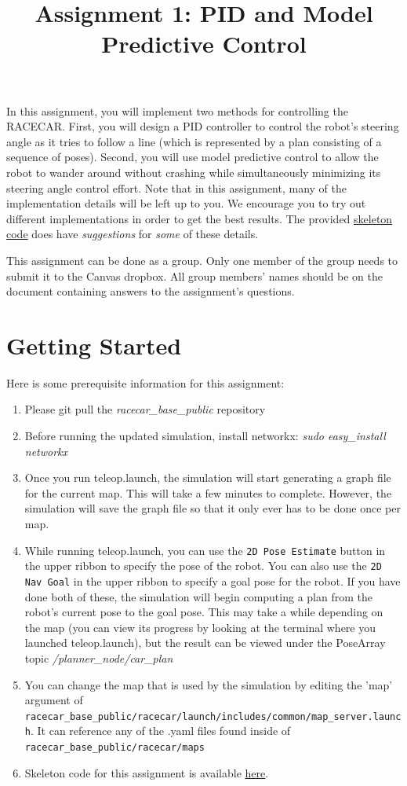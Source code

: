 \documentclass[final]{article}
\title{Assignment 1: PID and Model Predictive Control}
\begin{document}
\maketitle
In this assignment, you will implement two methods for controlling the RACECAR. First, you will design a PID controller to control the robot's steering angle as it tries to follow a line (which is represented by a plan consisting of a sequence of poses). Second, you will use model predictive control to allow the robot to wander around without crashing while simultaneously minimizing its steering angle control effort. Note that in this assignment, many of the implementation details will be left up to you. We encourage you to try out different implementations in order to get the best results. The provided \href{https://gitlab.cs.washington.edu/uw_racecar/course_materials/lab1}{skeleton code} does have \textit{suggestions} for \textit{some} of these details.

This assignment can be done as a group. Only one member of the group needs to submit it to the Canvas dropbox. All group members' names should be on the document containing answers to the assignment's questions.

\section{Getting Started}
Here is some prerequisite information for this assignment:

\begin{enumerate}
\item Please git pull the \textit{racecar\_base\_public} repository
\item Before running the updated simulation, install networkx: \textit{sudo easy\_install networkx}
\item Once you run teleop.launch, the simulation will start generating a graph file for the current map. This will take a few minutes to complete. However, the simulation will save the graph file so that it only ever has to be done once per map.
\item While running teleop.launch, you can use the \texttt{2D Pose Estimate} button in the upper ribbon to specify the pose of the robot. You can also use the \texttt{2D Nav Goal} in the upper ribbon to specify a goal pose for the robot. If you have done both of these, the simulation will begin computing a plan from the robot's current pose to the goal pose. This may take a while depending on the map (you can view its progress by looking at the terminal where you launched teleop.launch), but the result can be viewed under the PoseArray topic \textit{/planner\_node/car\_plan}
\item You can change the map that is used by the simulation by editing the 'map' argument of \texttt{racecar\_base\_public/racecar/launch/includes/common/map\_server.launch}. It can reference any of the .yaml files found inside of \texttt{racecar\_base\_public/racecar/maps}
\item Skeleton code for this assignment is available \href{https://gitlab.cs.washington.edu/uw_racecar/course_materials/lab1}{here}.
\end{enumerate}
\end{document}
